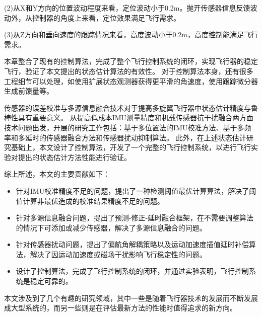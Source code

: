 \documentclass[
  type=master
]{gdutthesis}
\begin{document}
(2)从X和Y方向的位置波动程度来看，定位波动小于0.2m。抛开传感器信息反馈波动外，从控制器的角度上来看，定位效果满足飞行需求。

(3)从Z方向和垂向速度的跟踪情况来看，高度波动小于0.2m，高度控制能满足飞行需求。

本章整合了现有的控制算法，完成了整个飞行控制系统的闭环，实现飞行器的稳定飞行，验证了本文提出的状态估计算法的有效性。
对于控制算法本身，还有很多工程细节可以处理，如使用扩展状态观测器获得更平滑的角速度，使用跟踪微分器生成前馈量等。

\gdutbackmatter
{}
传感器的误差校准与多源信息融合技术对于提高多旋翼飞行器中状态估计精度与鲁棒性具有重要意义。
从提高低成本IMU测量精度和机载传感器抗干扰融合两方面技术问题出发，开展的研究工作包括：基于多位置法的IMU校准方法、基于多频率和多延时的传感器融合方法和传感器扰动抑制算法。
此外，在上述状态估计研究基础上，本文设计了控制算法，开发了一个完整的飞行控制系统，以进行飞行实验对提出的状态估计方法性能进行验证。

%
综上所述，本文的主要贡献如下：
\begin{itemize}
	\item 针对IMU校准精度不足的问题，提出了一种检测阈值最优计算算法，解决了阈值计算非最优造成的校准结果精度不足的问题。
	\item 针对多源信息融合问题，提出了预测-修正-延时融合框架，在不需要调整算法的情况下可添加或减少传感器，解决了多源信息融合的问题。
	\item 针对传感器扰动问题，提出了偏航角解耦策略以及运动加速度插值延时补偿算法，解决了因运动加速度或磁场干扰影响飞行稳定性的问题。
	\item 设计了控制算法，完成了飞行控制系统的闭环，并通过实验表明，飞行控制系统是稳定可靠的。
\end{itemize}

本文涉及到了几个有趣的研究领域，其中一些是随着飞行器技术的发展而不断发展成大型系统的，而另一些则是在评估最新方法的性能时值得追求的新方向。
\end{document}
